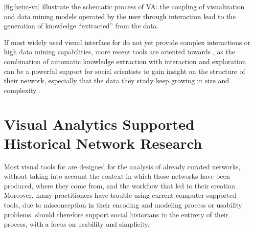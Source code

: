 \autoref{fig:keim-va} illustrate the schematic process of VA: the coupling of visualization and data mining models operated by the user through interaction lead to the generation of knowledge ``extracted'' from the data.

If most widely used visual interface for \hsna do not yet provide complex interactions or high data mining capabilities, more recent tools are oriented towards \va, as the combination of automatic knowledge extraction with interaction and exploration can be a powerful support for social scientists to gain insight on the structure of their network, especially that the data they study keep growing in size and complexity \cite{kaplanVeniceTimeMachine2015}.





\section{Visual Analytics Supported Historical Network Research}\label{sec:intro-HSNV}

Most visual tools for \sna are designed for the analysis of already curated networks, without taking into account the context in which those networks have been produced, where they come from, and the workflow that led to their creation.
Moreover, many practitioners have trouble using current computer-supported tools, due to misconception in their encoding and modeling process or usability problems.
\va should therefore support social historians in the entirety of their process, with a focus on usability and simplicity.

